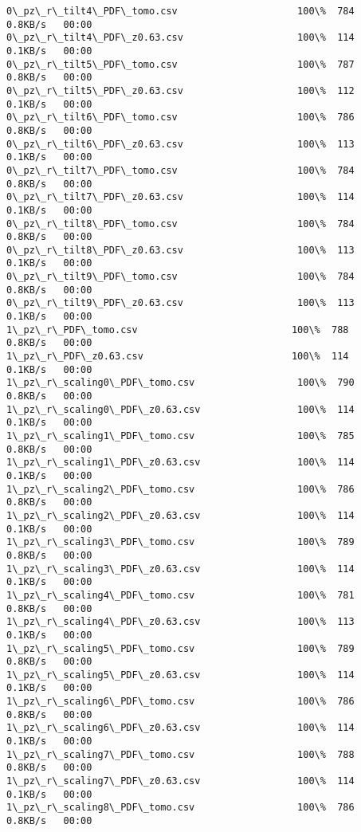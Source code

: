 \documentclass[11pt]{article}
\begin{document}
\begin{Verbatim}[commandchars=\\\{\}]
0\_pz\_r\_tilt4\_PDF\_tomo.csv                     100\%  784     0.8KB/s   00:00    
0\_pz\_r\_tilt4\_PDF\_z0.63.csv                    100\%  114     0.1KB/s   00:00    
0\_pz\_r\_tilt5\_PDF\_tomo.csv                     100\%  787     0.8KB/s   00:00    
0\_pz\_r\_tilt5\_PDF\_z0.63.csv                    100\%  112     0.1KB/s   00:00    
0\_pz\_r\_tilt6\_PDF\_tomo.csv                     100\%  786     0.8KB/s   00:00    
0\_pz\_r\_tilt6\_PDF\_z0.63.csv                    100\%  113     0.1KB/s   00:00    
0\_pz\_r\_tilt7\_PDF\_tomo.csv                     100\%  784     0.8KB/s   00:00    
0\_pz\_r\_tilt7\_PDF\_z0.63.csv                    100\%  114     0.1KB/s   00:00    
0\_pz\_r\_tilt8\_PDF\_tomo.csv                     100\%  784     0.8KB/s   00:00    
0\_pz\_r\_tilt8\_PDF\_z0.63.csv                    100\%  113     0.1KB/s   00:00    
0\_pz\_r\_tilt9\_PDF\_tomo.csv                     100\%  784     0.8KB/s   00:00    
0\_pz\_r\_tilt9\_PDF\_z0.63.csv                    100\%  113     0.1KB/s   00:00    
1\_pz\_r\_PDF\_tomo.csv                           100\%  788     0.8KB/s   00:00    
1\_pz\_r\_PDF\_z0.63.csv                          100\%  114     0.1KB/s   00:00    
1\_pz\_r\_scaling0\_PDF\_tomo.csv                  100\%  790     0.8KB/s   00:00    
1\_pz\_r\_scaling0\_PDF\_z0.63.csv                 100\%  114     0.1KB/s   00:00    
1\_pz\_r\_scaling1\_PDF\_tomo.csv                  100\%  785     0.8KB/s   00:00    
1\_pz\_r\_scaling1\_PDF\_z0.63.csv                 100\%  114     0.1KB/s   00:00    
1\_pz\_r\_scaling2\_PDF\_tomo.csv                  100\%  786     0.8KB/s   00:00    
1\_pz\_r\_scaling2\_PDF\_z0.63.csv                 100\%  114     0.1KB/s   00:00    
1\_pz\_r\_scaling3\_PDF\_tomo.csv                  100\%  789     0.8KB/s   00:00    
1\_pz\_r\_scaling3\_PDF\_z0.63.csv                 100\%  114     0.1KB/s   00:00    
1\_pz\_r\_scaling4\_PDF\_tomo.csv                  100\%  781     0.8KB/s   00:00    
1\_pz\_r\_scaling4\_PDF\_z0.63.csv                 100\%  113     0.1KB/s   00:00    
1\_pz\_r\_scaling5\_PDF\_tomo.csv                  100\%  789     0.8KB/s   00:00    
1\_pz\_r\_scaling5\_PDF\_z0.63.csv                 100\%  114     0.1KB/s   00:00    
1\_pz\_r\_scaling6\_PDF\_tomo.csv                  100\%  786     0.8KB/s   00:00    
1\_pz\_r\_scaling6\_PDF\_z0.63.csv                 100\%  114     0.1KB/s   00:00    
1\_pz\_r\_scaling7\_PDF\_tomo.csv                  100\%  788     0.8KB/s   00:00    
1\_pz\_r\_scaling7\_PDF\_z0.63.csv                 100\%  114     0.1KB/s   00:00    
1\_pz\_r\_scaling8\_PDF\_tomo.csv                  100\%  786     0.8KB/s   00:00    

\end{Verbatim}
\end{document}
